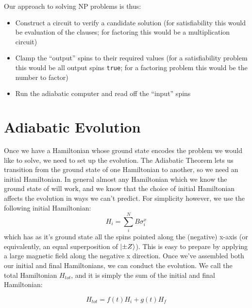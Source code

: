 Our approach to solving NP problems is thus:
\begin{itemize}
	\item Construct a circuit to verify a candidate solution (for satisfiability this would be evaluation of the clauses; for factoring this would be a multiplication circuit)
	\item Clamp the ``output'' spins to their required values (for a satisfiability problem this would be all output spins \texttt{true}; for a factoring problem this would be the number to factor)
	\item Run the adiabatic computer and read off the ``input'' spins
\end{itemize}

\section{Adiabatic Evolution}
Once we have a Hamiltonian whose ground state encodes the problem we would like to solve, we need to set up the evolution.  The Adiabatic Theorem lets us transition from the ground state of one Hamiltonian to another, so we need an initial Hamiltonian.  In general almost any Hamiltonian which we know the ground state of will work, and we know that the choice of initial Hamiltonian affects the evolution in ways we can't predict.  For simplicity however, we use the following initial Hamiltonian:
\begin{displaymath}
	H_i = \sum_i^N B \sigma_i^x
\end{displaymath}
which has as it's ground state all the spins pointed along the (negative) x-axis (or equivalently, an equal superposition of $\mathinner{|{\pm Z}\rangle}$).  This is easy to prepare by applying a large magnetic field along the negative x direction.
Once we've assembled both our initial and final Hamiltonians, we can conduct the evolution.  We call the total Hamiltonian $H_{tot}$, and it is simply the sum of the initial and final Hamiltonian:

\begin{displaymath}
	H_{tot} = f(t)H_i + g(t)H_f
\end{displaymath}

